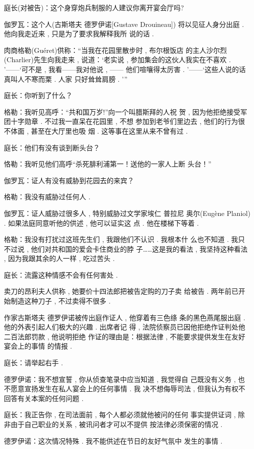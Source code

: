 庭长(对被告)：这个身穿炮兵制服的人建议你离开宴会厅吗?

伽罗瓦：这个人(古斯塔夫 \textbullet 德罗伊诺[Gustave Drouineau]) 将以见征人身分出庭 . 他向我走近来 , 只是为了要求我解释我所 说的话 . 

肉商格勒(Guéret)供称：“当我在花园里散步时 , 布尔根饭店 的主人沙尔烈(Charlier)先生向我走来 , 说道：‘老实说 , 参加集会的这伙人我实在不喜欢 . ’——‘可不是 , 我看——我对他说 , —— 他们喧嚷得太厉害 . ’——‘这些人说的话真叫人不寒而栗 . 人家 只好耸耸肩膀 . ’”

庭长：你听到了什么？

格勒：我听见高呼：“共和国万岁!”向一个叫腊斯拜的人祝 贺 , 因为他拒绝接受军团十字勋章 . 不过我一直呆在花园里 , 不想 参加到老爷们里边去 , 他们的行为很不体面 , 甚至在大厅里也吸 烟 . 这等事在这里从来不曾有过 . 

庭长：他们有没有谈到断头台？

恪勒：我听见他们高呼“杀死腓利浦第一！送他的一家人上断 头台！”

伽罗瓦：证人有没有威胁到花园去的来宾？

格勒：我没有威胁过任何人 . 

伽罗瓦：证人威胁过很多人 , 特别威胁过文学家埃仁 \textbullet 普拉尼 奥尔(Eugène Planiol) . 如果法庭同意听他的供述 , 他可以证实这 点 . 他在楼梯下等着 . 

格勒：我没有打扰过这班先生们 , 我跟他们不认识 . 我根本什 么也不知道 . 我只不过说 , 他们对共和国的爱会卡住商业的脖 子……这是我的看法 , 我坚持这种看法 , 因为我跟其余的人一样 ,  吃过苦头 . 

庭长：流露这种情感不会有任何害处 . 

卖刀的昂利夫人供称 , 她要价十四法郎把被告定购的刀子卖 给被告 . 两年前已开始制造这种刀子 , 不过卖得不很多 . 

作家古斯塔夫 \textbullet 德罗伊诺被传出庭作证人 , 他穿着有三色绦 条的黑色燕尾服出庭 . 他的外表引起人们极大的兴趣 . 出席者记 得 , 法院侦察员已因他拒绝作证判处他二百法郎罚款 , 他说明拒绝 作证的理由是：根据法律 , 不能要求提供发生在友好宴会上的事情 的情报 . 

庭长：请举起右手 . 

德罗伊诺：我不想宣誓 , 你从侦查笔录中应当知道 , 我觉得自 己既没有义务 , 也不愿意宣扬发生在私人宴会上的任何事情 . 我 决不想侮辱司法 , 但我认为有权不回答有关本案的任何问题 . 

庭长：我正告你 , 在司法面前 , 每个人都必须就他被问的任何 事实提供证词 , 除非由于自己职业的关系 , 被讯问者才可以不提供 按法律必须保密的情况 . 


德罗伊诺：这次情况特殊 . 我不能供述在节日的友好气氛中 发生的事情 . 

